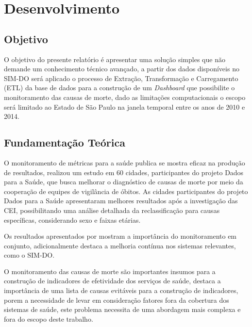 

\chapter{Desenvolvimento}\label{cap_exemplos}

\section{Objetivo}

O objetivo do presente relatório é apresentar uma solução simples que não demande um conhecimento técnico avançado, a partir dos dados disponíveis no SIM-DO será aplicado o processo de Extração, Transformação e Carregamento (ETL) da base de dados para a construção de um \textit{Dashboard} que possibilite o monitoramento das causas de morte, dado as limitações computacionais o escopo será limitado ao Estado de São Paulo na janela temporal entre os anos de 2010 e 2014.

\section{Fundamentação Teórica}

O monitoramento de métricas para a saúde publica se mostra eficaz na produção de resultados,  realizou um estudo em 60 cidades, participantes do projeto Dados para a Saúde, que busca melhorar o diagnóstico de causas de morte por meio da cooperação de equipes de vigilância de óbitos. As cidades participantes do projeto Dados para a Saúde apresentaram melhores resultados após a investigação das CEI, possibilitando uma análise detalhada da reclassificação para causas específicas, considerando sexo e faixas etárias.

Os resultados apresentados por  mostram a importância do monitoramento em conjunto, adicionalmente destaca a melhoria contínua nos sistemas relevantes, como o SIM-DO.

O monitoramento das causas de morte são importantes insumos para a construção de indicadores de efetividade dos serviços de saúde,  destaca a importância de uma lista de causas evitáveis para a construção de indicadores, porem a necessidade de levar em consideração fatores fora da cobertura dos sistemas de saúde, este problema necessita de uma abordagem mais complexa e fora do escopo deste trabalho.

